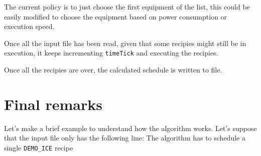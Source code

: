 \documentclass[12pt]{article}
\newcommand{\code}[1]{\colorbox{light-gray}{\texttt{#1}}}
\begin{document}
The current policy is to just choose the first equipment of the list, this could be easily modified to choose the equipment based on power consumption or execution speed.

Once all the input file has been read, given that some recipies might still be in execution, it keeps incrementing \code{timeTick} and executing the recipies.

Once all the recipies are over, the calculated schedule is written to file.

\section{Final remarks}
Let's make a brief example to understand how the algorithm works.
Let's suppose that the input file only has the following line:
The algorithm has to schedule a single \code{DEMO\_ICE} recipe
\end{document}
